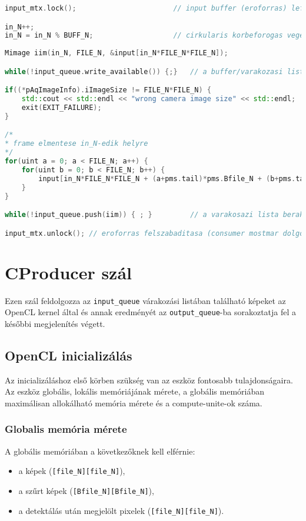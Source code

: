 \begin{lstlisting}[language=C++]
input_mtx.lock();						// input buffer (eroforras) lefoglalasa

in_N++;
in_N = in_N % BUFF_N;					// cirkularis korbeforogas vegett
 
Mimage iim(in_N, FILE_N, &input[in_N*FILE_N*FILE_N]);

while(!input_queue.write_available()) {;}	// a buffer/varakozasi lista kiurulesere varas

if((*pAqImageInfo).iImageSize != FILE_N*FILE_N) {
	std::cout << std::endl << "wrong camera image size" << std::endl;
	exit(EXIT_FAILURE);
}

/*
* frame elmentese in_N-edik helyre
*/
for(uint a = 0; a < FILE_N; a++) {
	for(uint b = 0; b < FILE_N; b++) {
		input[in_N*FILE_N*FILE_N + (a+pms.tail)*pms.Bfile_N + (b+pms.tail)] = (*pAqImageInfo).pImageBuffer[a*pms.file_N + b];
	}
}

while(!input_queue.push(iim)) { ; }			// a varakosazi lista berakas

input_mtx.unlock(); // eroforras felszabaditasa (consumer mostmar dolgozhat rajta)
\end{lstlisting}
	
\section{CProducer szál}
Ezen szál feldolgozza az \texttt{input\_queue} várakozási listában található képeket az OpenCL kernel által és annak eredményét az
\texttt{output\_queue}-ba sorakoztatja fel a későbbi megjelenítés végett.
	
	\subsection{OpenCL inicializálás}
	Az inicializáláshoz első körben szükség van az eszköz fontosabb tulajdonságaira. Az eszköz globális, lokális memóriájának mérete,
	a globális memóriában maximálisan allokálható memória mérete és a compute-unite-ok száma.
	\subsubsection{Globalis memória mérete}
	A globális memóriában a következőknek kell elférnie:
	\begin{itemize}[noitemsep]
	  \item a képek (\texttt{[file\_N][file\_N]}),
	  \item a szűrt képek (\texttt{[Bfile\_N][Bfile\_N]}),
	  \item a detektálás után megjelölt pixelek (\texttt{[file\_N][file\_N]}).
	\end{itemize}
	

